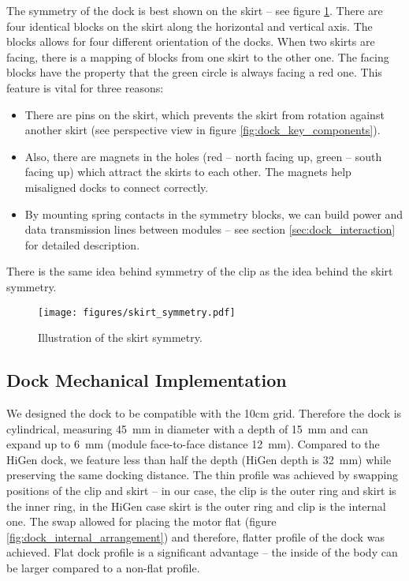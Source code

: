 The symmetry of the dock is best shown on the skirt -- see figure
\ref{fig:dock_skirt_symmetry}. There are four identical blocks on the skirt
along the horizontal and vertical axis. The blocks allows for four different
orientation of the docks. When two skirts are facing, there is a mapping of
blocks from one skirt to the other one. The facing blocks have the property that
the green circle is always facing a red one. This feature is vital for
three reasons:
\begin{itemize}
    \item There are pins on the skirt, which prevents the skirt from
    rotation against another skirt (see perspective view in figure
    \ref{fig:dock_key_components}).
    \item Also, there are magnets in the holes (red -- north facing up, green --
    south facing up) which attract the skirts to each other. The magnets help
    misaligned docks to connect correctly.
    \item By mounting spring contacts in the symmetry blocks, we can build power
    and data transmission lines between modules -- see section
    \ref{sec:dock_interaction} for detailed description.
\end{itemize}
There is the same idea behind symmetry of the clip as the idea behind the skirt
symmetry.

\begin{figure}[!ht]
    \centering
    \texttt{[image: figures/skirt\_symmetry.pdf]}
    \caption{Illustration of the skirt symmetry.}
    \label{fig:dock_skirt_symmetry}
\end{figure}

\subsection{Dock Mechanical Implementation}

We designed the dock to be compatible with the 10cm grid. Therefore the dock is
cylindrical, measuring 45~mm in diameter with a depth of 15~mm and can expand up
to 6~mm (module face-to-face distance 12~mm). Compared to the HiGen dock, we
feature less than half the depth (HiGen depth is 32~mm) while preserving the
same docking distance. The thin profile was achieved by swapping positions of
the clip and skirt -- in our case, the clip is the outer ring and skirt is the
inner ring, in the HiGen case skirt is the outer ring and clip is the internal
one. The swap allowed for placing the motor flat (figure
\ref{fig:dock_internal_arrangement}) and therefore, flatter profile of the dock
was achieved. Flat dock profile is a significant advantage -- the inside of the
body can be larger compared to a non-flat profile.

